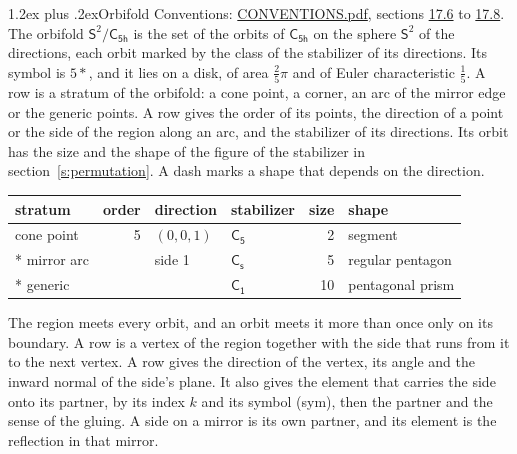 \documentclass[10pt,a4paper]{article}
\makeatletter
\renewcommand\section{\@startsection{section}{1}{\z@}{-3ex plus -1ex minus -.2ex}%
  {1.2ex plus .2ex}{\normalfont\large\sffamily\bfseries\color{parttitle}}}
\numberwithin{equation}{section}
\newcommand{\grp}[1]{\mathsf{#1}}
\newcommand{\orbname}[1]{#1}
\newcommand{\dirvec}[3]{(#1, #2, #3)}
\newcommand{\twosphere}{\mathsf{S}^{2}}
\makeatother
\begin{document}
\section{Orbifold}\label{s:orbifold}
Conventions: \href{../../CONVENTIONS.pdf}{CONVENTIONS.pdf}, sections \href{../../CONVENTIONS.pdf\#conv.17.6}{17.6} to \href{../../CONVENTIONS.pdf\#conv.17.8}{17.8}.
The orbifold $\twosphere/\grp{C_{5h}}$ is the set of the orbits of $\grp{C_{5h}}$ on the sphere $\twosphere$ of the directions, each orbit marked by the class of the stabilizer of its directions. Its symbol is $\orbname{5{\ast}}$, and it lies on a disk, of area $\tfrac{2}{5}\pi$ and of Euler characteristic $\tfrac{1}{5}$.
\leavevmode\label{n:head.stratum}\label{n:head.order.point}\label{n:head.direction}\label{n:head.stabilizer}\label{n:head.size.orbit}\label{n:head.shape}A row is a stratum of the orbifold: a cone point, a corner, an arc of the mirror edge or the generic points. A row gives the order of its points, the direction of a point or the side of the region along an arc, and the stabilizer of its directions. Its orbit has the size and the shape of the figure of the stabilizer in section~\ref{s:permutation}. A dash marks a shape that depends on the direction.
{\small\setlength{\tabcolsep}{4pt}\begin{longtable}{@{}lrllrl@{}}\toprule
stratum & order & direction & stabilizer & size & shape\\\midrule\endhead
\bottomrule\endfoot\endlastfoot
cone point & 5 & $\dirvec{0}{0}{1}$ & \href{C5.pdf}{$\grp{C_{5}}$} & 2 & segment\\*
mirror arc &  & side 1 & \href{C1v.pdf}{$\grp{C_{s}}$} & 5 & regular pentagon\\*
generic &  &  & \href{C1.pdf}{$\grp{C_{1}}$} & 10 & pentagonal prism\\
\bottomrule\end{longtable}}
\leavevmode\label{n:head.vertex.region}\label{n:head.angle}\label{n:head.normal.side}\label{n:head.partner}\label{n:head.sense}The region meets every orbit, and an orbit meets it more than once only on its boundary. A row is a vertex of the region together with the side that runs from it to the next vertex. A row gives the direction of the vertex, its angle and the inward normal of the side's plane. It also gives the element that carries the side onto its partner, by its index $k$ and its symbol (sym), then the partner and the sense of the gluing. A side on a mirror is its own partner, and its element is the reflection in that mirror.
\end{document}
